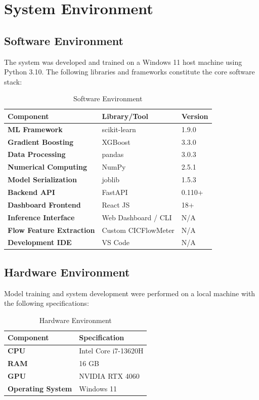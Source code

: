 \documentclass[12pt,a4paper]{report}
\begin{document}
\section{System Environment}

\subsection{Software Environment}

The system was developed and trained on a Windows 11 host machine using Python 3.10. The following libraries and frameworks constitute the core software stack:

\begin{table}[H]
\centering
\renewcommand{\arraystretch}{1.3}
\begin{tabularx}{\textwidth}{|>{\bfseries}p{5cm}|p{4.5cm}|X|}
\hline
\textbf{Component} & \textbf{Library/Tool} & \textbf{Version} \\
\hline
ML Framework & scikit-learn & 1.9.0 \\
\hline
Gradient Boosting & XGBoost & 3.3.0 \\
\hline
Data Processing & pandas & 3.0.3 \\
\hline
Numerical Computing & NumPy & 2.5.1 \\
\hline
Model Serialization & joblib & 1.5.3 \\
\hline
Backend API & FastAPI & 0.110+ \\
\hline
Dashboard Frontend & React JS & 18+ \\
\hline
Inference Interface & Web Dashboard / CLI & N/A \\
\hline
Flow Feature Extraction & Custom CICFlowMeter & N/A \\
\hline
Development IDE & VS Code & N/A \\
\hline
\end{tabularx}
\caption{Software Environment}
\label{tab:software}
\end{table}
\newpage
\subsection{Hardware Environment}

Model training and system development were performed on a local machine with the following specifications:

\begin{table}[H]
\centering
\renewcommand{\arraystretch}{1.3}
\begin{tabularx}{\textwidth}{|>{\bfseries}p{5cm}|X|}
\hline
\textbf{Component} & \textbf{Specification} \\
\hline
CPU & Intel Core i7-13620H \\
\hline
RAM & 16 GB \\
\hline
GPU & NVIDIA RTX 4060 \\
\hline
Operating System & Windows 11 \\
\hline
\end{tabularx}
\caption{Hardware Environment}
\label{tab:hardware}
\end{table}
\end{document}
